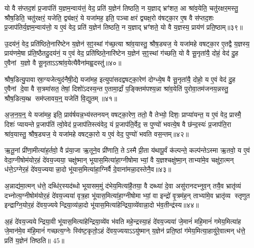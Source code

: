 यो वै स॑प्तद॒शं प्र॒जाप॑तिं य॒ज्ञम॒न्वाय॑त्तं॒ वेद॒ प्रति॑ य॒ज्ञेन॑ तिष्ठति॒ न य॒ज्ञाद् भ्रꣳ॑शत॒ आ श्रा॑व॒येति॒ चतु॑रक्षर॒मस्तु॒ श्रौष॒डिति॒ चतु॑रक्षरं॒ यजेति॒ द्व्य॑क्षरं॒ ये यजा॑मह॒ इति॒ पञ्चाक्षरं द्व्यक्ष॒रो व॑षट्का॒र ए॒ष वै स॑प्तद॒शः प्र॒जाप॑तिर्य॒ज्ञम॒न्वाय॑त्तो॒ य ए॒वं वेद॒ प्रति॑ य॒ज्ञेन॑ तिष्ठति॒ न य॒ज्ञाद् भ्रꣳ॑शते॒ यो वै य॒ज्ञस्य॒ प्राय॑णं प्रति॒ष्ठाम्॥३९॥

उ॒दय॑नं॒ वेद॒ प्रति॑ष्ठिते॒नारि॑ष्टेन य॒ज्ञेन॑ स॒ꣵ॒स्थां ग॑च्छ॒त्या श्रा॑व॒यास्तु॒ श्रौष॒ड्यज॒ ये यजा॑महे वषट्का॒र ए॒तद्वै य॒ज्ञस्य॒ प्राय॑णमे॒षा प्र॑ति॒ष्ठैतदु॒दय॑नं॒ य ए॒वं वेद॒ प्रति॑ष्ठिते॒नारि॑ष्टेन य॒ज्ञेन॑ स॒ꣵ॒स्थां ग॑च्छति॒ यो वै सू॒नृता॑यै॒ दोहं॒ वेद॑ दु॒ह ए॒वैनां य॒ज्ञो वै सू॒नृताऽऽश्रा॑व॒येत्यैवैना॑मह्व॒दस्तु॑॥४०॥

श्रौष॒डित्यु॒पावास्रा॒ग्यजेत्युद॑नैषी॒द्ये यजा॑मह॒ इत्युपा॑सदद्वषट्का॒रेण॑ दोग्ध्ये॒ष वै सू॒नृता॑यै॒ दोहो॒ य ए॒वं वेद॑ दु॒ह ए॒वैनां दे॒वा वै स॒त्रमा॑सत॒ तेषां॒ दिशो॑ऽदस्य॒न्त ए॒तामा॒र्द्रां प॒ङ्क्तिम॑पश्य॒न्ना श्रा॑व॒येति॑ पुरोवा॒तम॑जनय॒न्नस्तु॒ श्रौष॒डित्य॒ब्भ्र सम॑प्लावय॒न्॒ यजेति॑ वि॒द्युतम्॥४१॥

अ॒ज॒न॒य॒न्॒ ये यजा॑मह॒ इति॒ प्राव॑र्\mbox{}षयन्न॒भ्य॑स्तनयन् वषट्का॒रेण॒ ततो॒ वै तेभ्यो॒ दिशः॒ प्राप्या॑यन्त॒ य ए॒वं वेद॒ प्रास्मै॒ दिशः॑ प्यायन्ते प्र॒जाप॑तिं त्वो॒वेद॑ प्र॒जाप॑तिस्त्वंवेद॒ यं प्र॒जाप॑ति॒र्वेद॒ स पुण्यो॑ भवत्ये॒ष वै छ॑न्द॒स्यः॑ प्र॒जाप॑ति॒रा श्रा॑व॒यास्तु॒ श्रौष॒ड्यज॒ ये यजा॑महे वषट्का॒रो य ए॒वं वेद॒ पुण्यो॑ भवति वस॒न्तम्॥४२॥

ऋ॒तू॒नां प्री॑णा॒मीत्या॑ह॒र्तवो॒ वै प्र॑या॒जा ऋ॒तूने॒व प्री॑णाति॒ तेऽस्मै प्री॒ता य॑थापू॒र्वं क॑ल्पन्ते॒ कल्प॑न्तेऽस्मा ऋ॒तवो॒ य ए॒वं वेदा॒ग्नीषोम॑योर॒हं दे॑वय॒ज्यया॒ चक्षु॑ष्मान् भूयास॒मित्या॑हा॒ग्नीषोमाभ्यां॒ वै य॒ज्ञश्चक्षु॑ष्मा॒न् ताभ्या॑मे॒व चक्षु॑रा॒त्मन् ध॑त्ते॒ऽग्नेर॒हं दे॑वय॒ज्ययान्ना॒दो भू॑यास॒मित्या॑हा॒ग्निर्वै दे॒वाना॑मन्ना॒दस्तेनै॒व॥४३॥

अ॒न्नाद्य॑मा॒त्मन् ध॑त्ते॒ दब्धि॑र॒स्यद॑ब्धो भूयासम॒मुं द॑भेय॒मित्या॑है॒तया॒ वै दब्ध्या॑ दे॒वा असु॑रानदभ्नुव॒न् तयै॒व भ्रातृ॑व्यं दभ्नोत्य॒ग्नीषोम॑योर॒हं दे॑वय॒ज्यया॑ वृत्र॒हा भू॑यास॒मित्या॑हा॒ग्नीषोमाभ्यां॒ वा इन्द्रो॑ वृ॒त्रम॑ह॒न् ताभ्या॑मे॒व भ्रातृ॑व्य स्तृणुत इन्द्राग्नि॒योर॒हं दे॑वय॒ज्ययेन्द्रिया॒व्य॑न्ना॒दो भू॑यास॒मित्या॑हेन्द्रिया॒व्ये॑वान्ना॒दो भ॑व॒तीन्द्र॑स्य॥४४॥

अ॒हं दे॑वय॒ज्ययेन्द्रिया॒वी भू॑यास॒मित्या॑हेन्द्रिया॒व्ये॑व भ॑वति महे॒न्द्रस्या॒हं दे॑वय॒ज्यया॑ जे॒मानं॑ महि॒मानं॑ गमेय॒मित्या॑ह जे॒मान॑मे॒व म॑हि॒मानं॑ गच्छत्य॒ग्नेः स्वि॑ष्ट॒कृतो॒ऽहं दे॑वय॒ज्ययाऽऽयु॑ष्मान् य॒ज्ञेन॑ प्रति॒ष्ठां ग॑मेय॒मित्या॒हायु॑रे॒वात्मन् ध॑त्ते॒ प्रति॑ य॒ज्ञेन॑ तिष्ठति॥ 45॥

